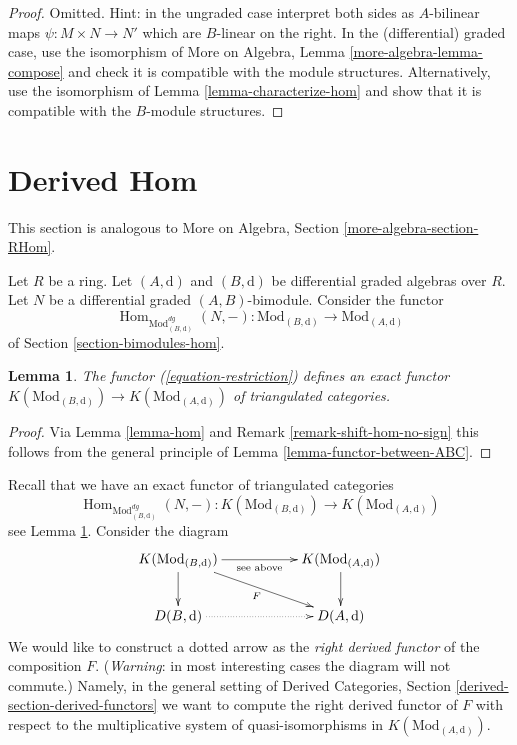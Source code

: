 \documentclass{stacks-project}
\theoremstyle{plain}
\newtheorem{lemma}[subsection]{Lemma}
\theoremstyle{definition}
\theoremstyle{remark}
\numberwithin{equation}{subsection}
\def\Hom{\mathop{\mathrm{Hom}}\nolimits}
\begin{document}
\begin{proof}
Omitted. Hint: in the ungraded case interpret both sides as $A$-bilinear maps
$\psi : M \times N \to N'$ which are $B$-linear on the right.
In the (differential) graded case, use the isomorphism of
More on Algebra, Lemma \ref{more-algebra-lemma-compose}
and check it is compatible with the module structures.
Alternatively, use the isomorphism of Lemma \ref{lemma-characterize-hom}
and show that it is compatible with the $B$-module structures.
\end{proof}







\section{Derived Hom}
\label{section-restriction}

\noindent
This section is analogous to
More on Algebra, Section \ref{more-algebra-section-RHom}.

\medskip\noindent
Let $R$ be a ring. Let $(A, \text{d})$ and $(B, \text{d})$
be differential graded algebras over $R$. Let $N$ be a
differential graded $(A, B)$-bimodule. Consider the functor
\begin{equation}
\label{equation-restriction}
\Hom_{\text{Mod}^{dg}_{(B, \text{d})}}(N, -) :
\text{Mod}_{(B, \text{d})}
\longrightarrow
\text{Mod}_{(A, \text{d})}
\end{equation}
of Section \ref{section-bimodules-hom}.

\begin{lemma}
\label{lemma-restriction-homotopy}
The functor (\ref{equation-restriction}) defines an exact functor
$K(\text{Mod}_{(B, \text{d})}) \to K(\text{Mod}_{(A, \text{d})})$
of triangulated categories.
\end{lemma}

\begin{proof}
Via Lemma \ref{lemma-hom} and
Remark \ref{remark-shift-hom-no-sign}
this follows from the general principle of
Lemma \ref{lemma-functor-between-ABC}.
\end{proof}

\noindent
Recall that we have an exact functor
of triangulated categories
$$
\Hom_{\text{Mod}^{dg}_{(B, \text{d})}}(N, -) :
K(\text{Mod}_{(B, \text{d})}) \to K(\text{Mod}_{(A, \text{d})})
$$
see Lemma \ref{lemma-restriction-homotopy}. Consider the diagram
$$
\xymatrix{
K(\text{Mod}_{(B, \text{d})}) \ar[d] \ar[rr]_{\text{see above}} \ar[rrd]_F & &
K(\text{Mod}_{(A, \text{d})}) \ar[d] \\
D(B, \text{d}) \ar@{..>}[rr] & &
D(A, \text{d})
}
$$
We would like to construct a dotted arrow as the
{\it right derived functor} of the composition $F$.
({\it Warning}: in most interesting cases the diagram will not commute.)
Namely, in the general setting of
Derived Categories, Section \ref{derived-section-derived-functors}
we want to compute the
right derived functor of $F$ with respect to the multiplicative system of
quasi-isomorphisms in $K(\text{Mod}_{(A, \text{d})})$.
\end{document}
